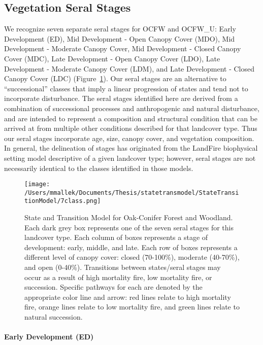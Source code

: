 \subsection*{Vegetation Seral Stages}
We recognize seven separate seral stages for OCFW and OCFW\_U: Early Development (ED), Mid Development - Open Canopy Cover (MDO), Mid Development - Moderate Canopy Cover, Mid Development - Closed Canopy Cover (MDC), Late Development - Open Canopy Cover (LDO), Late Development - Moderate Canopy Cover (LDM), and Late Development - Closed Canopy Cover (LDC) (Figure~\ref{transmodel_ocfw}). Our seral stages are an alternative to ``successional'' classes that imply a linear progression of states and tend not to incorporate disturbance. The seral stages identified here are derived from a combination of successional processes and anthropogenic and natural disturbance, and are intended to represent a composition and structural condition that can be arrived at from multiple other conditions described for that landcover type. Thus our seral stages incorporate age, size, canopy cover, and vegetation composition. In general, the delineation of stages has originated from the LandFire biophysical setting model descriptive of a given landcover type; however, seral stages are not necessarily identical to the classes identified in those models.

\begin{figure}[htbp]
\centering
\texttt{[image: /Users/mmallek/Documents/Thesis/statetransmodel/StateTransitionModel/7class.png]}
\caption{State and Transition Model for Oak-Conifer Forest and Woodland. Each dark grey box represents one of the seven seral stages for this landcover type. Each column of boxes represents a stage of development: early, middle, and late. Each row of boxes represents a different level of canopy cover: closed (70-100\%), moderate (40-70\%), and open (0-40\%). Transitions between states/seral stages may occur as a result of high mortality fire, low mortality fire, or succession. Specific pathways for each are denoted by the appropriate color line and arrow: red lines relate to high mortality fire, orange lines relate to low mortality fire, and green lines relate to natural succession.} 
\label{transmodel_ocfw}
\end{figure}

\paragraph{Early Development (ED)} 


